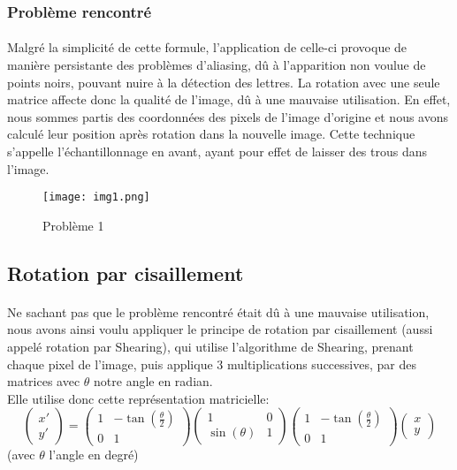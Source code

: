 \documentclass{article}
\begin{document}
\subsubsection{Problème rencontré}
\paragraph{}
Malgré la simplicité de cette formule, l’application de celle-ci provoque de manière persistante des problèmes d'aliasing, dû à l’apparition non voulue de points noirs, pouvant nuire à la détection des lettres. La rotation avec une seule matrice affecte donc la qualité de l’image, dû à une mauvaise utilisation. En effet, nous sommes partis des coordonnées des pixels de l'image d'origine et nous avons calculé leur position après rotation dans la nouvelle image. Cette technique s’appelle l'échantillonnage en avant, ayant pour effet de laisser des trous dans l’image.
\begin{figure}[H]
    \centering
    \texttt{[image: img1.png]}
    \caption{Problème 1}
\end{figure}
\subsection{Rotation par cisaillement}
\paragraph{}
Ne sachant pas que le problème rencontré était dû à une mauvaise utilisation, nous avons ainsi voulu appliquer le principe de rotation par cisaillement (aussi appelé rotation par Shearing), qui utilise l’algorithme de Shearing, prenant chaque pixel de l’image, puis applique 3 multiplications successives, par des matrices avec $\theta$ notre angle en radian. \\
Elle utilise donc cette représentation matricielle:
$$
\left(\begin{array}{cc} x' \\ y' \end{array}\right) = \left(\begin{array}{cc}
   1  & -\tan(\frac{\theta}{2}) \\
   0  & 1
\end{array}\right) \left(\begin{array}{cc}
   1  &  0\\
   \sin(\theta)  & 1
\end{array}\right)\left(\begin{array}{cc}
    1 &  -\tan(\frac{\theta}{2})\\
    0 & 1
\end{array}\right)\left(\begin{array}{cc} x \\ y \end{array}\right)
$$
(avec $\theta$ l’angle en degré)
\end{document}
